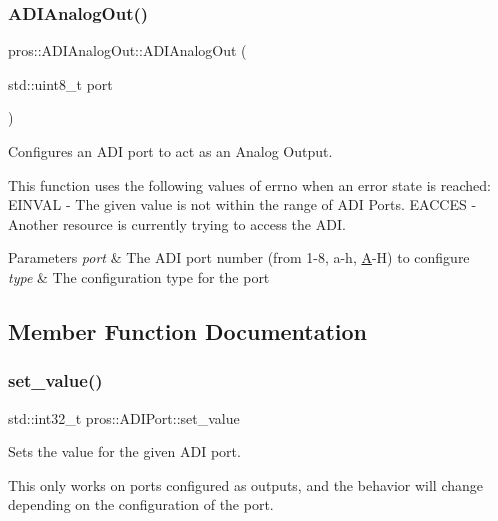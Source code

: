 \subsubsection{\texorpdfstring{ADIAnalogOut()}{ADIAnalogOut()}}
{\footnotesize\ttfamily pros\+::\+A\+D\+I\+Analog\+Out\+::\+A\+D\+I\+Analog\+Out (\begin{DoxyParamCaption}\item[{std\+::uint8\+\_\+t}]{port }\end{DoxyParamCaption})}



Configures an A\+DI port to act as an Analog Output. 

This function uses the following values of errno when an error state is reached\+: E\+I\+N\+V\+AL -\/ The given value is not within the range of A\+DI Ports. E\+A\+C\+C\+ES -\/ Another resource is currently trying to access the A\+DI.


\begin{DoxyParams}{Parameters}
{\em port} & The A\+DI port number (from 1-\/8, \textquotesingle{}a\textquotesingle{}-\/\textquotesingle{}h\textquotesingle{}, \textquotesingle{}\mbox{\hyperlink{structA}{A}}\textquotesingle{}-\/\textquotesingle{}H\textquotesingle{}) to configure \\
\hline
{\em type} & The configuration type for the port \\
\hline
\end{DoxyParams}


\subsection{Member Function Documentation}
\mbox{\label{classpros_1_1ADIAnalogOut_ae6711117fbceb3bb6e3602c4ef63aff1}} 
\subsubsection{\texorpdfstring{set\_value()}{set\_value()}}
{\footnotesize\ttfamily std\+::int32\+\_\+t pros\+::\+A\+D\+I\+Port\+::set\+\_\+value}



Sets the value for the given A\+DI port. 

This only works on ports configured as outputs, and the behavior will change depending on the configuration of the port.

